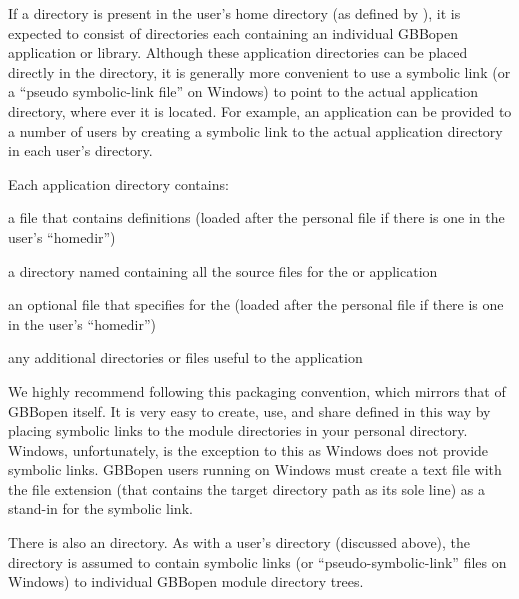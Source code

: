 \documentclass[10pt,twoside,english,pdftex]{article}
\begin{document}
If a  directory is present in the user's home
directory (as defined by ), it is expected
to consist of directories each containing an individual GBBopen application or
library.  Although these application directories can be placed directly in the
 directory, it is generally more convenient to
use a symbolic link (or a ``pseudo symbolic-link file'' on Windows) to point
to the actual application directory, where ever it is located.  For example,
an application can be provided to a number of users by creating a symbolic
link to the actual application directory in each user's
 directory.

Each application directory contains:
%
\begin{tightitemize}
\item a  file that contains  definitions
  (loaded after the personal  file if there is
  one in the user's ``homedir'')
\item a directory named  containing all the source files for the
   or application
\item an optional  file that specifies
   for the  (loaded after the personal
   file if there is one in the user's
  ``homedir'')
\item any additional directories or files useful to the application
\end{tightitemize}

We highly recommend following this packaging convention, which mirrors that of
GBBopen itself. It is very easy to create, use, and share 
defined in this way by placing symbolic links to the module directories in
your personal  directory.  Windows, unfortunately, is
the exception to this as Windows does not provide symbolic links.  GBBopen
users running on Windows must create a text file with the file extension
 (that contains the target directory path as its sole line) as a
stand-in for the symbolic link.

\label{sec:shared-gbbopen-modules-directory}

%
%
%
%
%
There is also an
 directory.
As with a user's  directory (discussed above),
the  directory is assumed to contain
symbolic links (or ``pseudo-symbolic-link'' files on Windows) to individual
GBBopen module directory trees.
\end{document}
